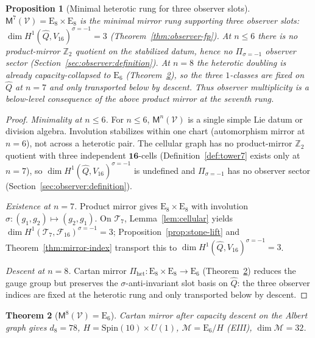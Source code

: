 \documentclass[11pt]{article}
\theoremstyle{plain}
\newtheorem{theorem}{Theorem}[section]
\newtheorem{proposition}[theorem]{Proposition}
\theoremstyle{definition}
\theoremstyle{remark}
\numberwithin{equation}{section}
\newcommand{\E}[1]{\mathrm{E}_{#1}}
\newcommand{\Spin}{\mathrm{Spin}}
\newcommand{\Void}{\mathcal{V}}
\newcommand{\Mirror}{\mathsf{M}}
\begin{document}
\begin{proposition}[Minimal heterotic rung for three observer slots]\label{prop:climb:minimal-heterotic}
$\Mirror^7(\Void)=\E{8}\times\E{8}$ is the \emph{minimal} mirror rung supporting
three observer slots: $\dim H^1(\hat Q,V_{16})^{\sigma=-1}=3$
(Theorem~\ref{thm:observer-fp}). At $n\leq6$ there is no product-mirror
$\mathbb{Z}_2$ quotient on the stabilized datum, hence no
$\Pi_{\sigma=-1}$ observer sector (Section~\ref{sec:observer:definition}). At
$n=8$ the heterotic doubling is already capacity-collapsed to $\E{6}$
(Theorem~\ref{thm:e6}), so the three $1$-classes are fixed on $\hat Q$ at
$n=7$ and only transported below by descent. Thus observer multiplicity is a
\emph{below}-level consequence of the \emph{above} product mirror at the
seventh rung.
\end{proposition}

\begin{proof}
\emph{Minimality at $n\leq6$.}
For $n\leq6$, $\Mirror^n(\Void)$ is a single simple Lie datum or division
algebra. Involution stabilizes within one chart (automorphism mirror at $n=6$),
not across a heterotic pair. The cellular graph has no product-mirror
$\mathbb{Z}_2$ quotient with three independent $\mathbf{16}$-cells
(Definition~\ref{def:tower7} exists only at $n=7$), so
$\dim H^1(\hat Q,V_{16})^{\sigma=-1}$ is undefined and
$\Pi_{\sigma=-1}$ has no observer sector
(Section~\ref{sec:observer:definition}).

\emph{Existence at $n=7$.}
Product mirror gives $\E{8}\times\E{8}$ with involution
$\sigma:(g_1,g_2)\mapsto(g_2,g_1)$. On $\mathcal{T}_7$,
Lemma~\ref{lem:cellular} yields
$\dim H^1(\mathcal{T}_7,\mathcal{F}_{16})^{\sigma=-1}=3$; Proposition~\ref{prop:stone-lift}
and Theorem~\ref{thm:mirror-index} transport this to
$\dim H^1(\hat Q,V_{16})^{\sigma=-1}=3$.

\emph{Descent at $n=8$.}
Cartan mirror $\Pi_{\mathrm{het}}:\E{8}\times\E{8}\to\E{6}$
(Theorem~\ref{thm:e6}) reduces the gauge group but preserves the
$\sigma$-anti-invariant slot basis on $\hat Q$: the three observer indices are
fixed at the heterotic rung and only transported below by descent.
\end{proof}

\begin{theorem}[$\Mirror^8(\Void)=\E{6}$]\label{thm:e6}
Cartan mirror after capacity descent on the Albert graph gives $d_8=78$,
$H=\Spin(10)\times U(1)$, $\mathcal{M}=\E{6}/H$ (EIII), $\dim\mathcal{M}=32$.
\end{theorem}
\end{document}
